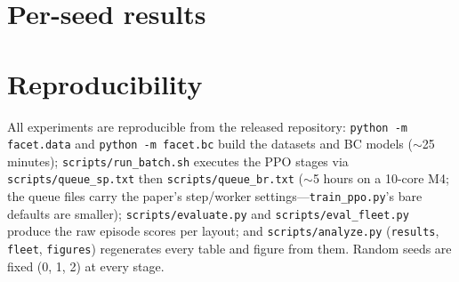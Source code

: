 \documentclass[11pt]{article}
\begin{document}
\section{Per-seed results}
\label{app:perseed}



\section{Reproducibility}
\label{app:repro}

All experiments are reproducible from the released repository:
\texttt{python -m facet.data} and \texttt{python -m facet.bc} build the
datasets and BC models ($\sim$25 minutes);
\texttt{scripts/run\_batch.sh} executes the PPO stages via
\texttt{scripts/queue\_sp.txt} then \texttt{scripts/queue\_br.txt}
($\sim$5 hours on a 10-core M4; the queue files carry the paper's
step/worker settings---\texttt{train\_ppo.py}'s bare defaults are
smaller); \texttt{scripts/evaluate.py} and \texttt{scripts/eval\_fleet.py}
produce the raw episode scores per layout; and
\texttt{scripts/analyze.py} (\texttt{results}, \texttt{fleet},
\texttt{figures}) regenerates every table and figure from them. Random
seeds are fixed (0, 1, 2) at every stage.
\end{document}
